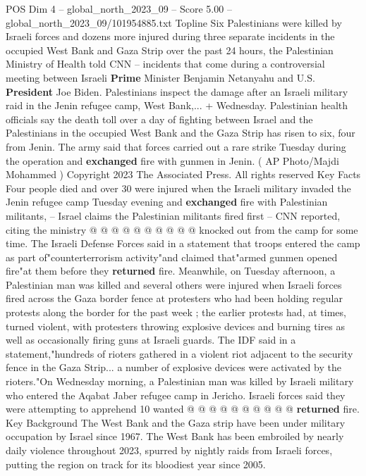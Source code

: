 \begin{textsample}{POS Dim 4 – global\_north\_2023\_09 – Score 5.00 – global\_north\_2023\_09/101954885.txt}  \label{ex:f4_pos_419}
Topline Six Palestinians were killed by Israeli forces and dozens more injured during three separate incidents in the occupied West Bank and Gaza Strip over the past 24 hours, the Palestinian Ministry of Health told CNN -- incidents that come during a controversial meeting between Israeli \textbf{Prime} Minister Benjamin Netanyahu and U.S. \textbf{President} Joe Biden.
Palestinians inspect the damage after an Israeli military raid in the Jenin refugee camp, West Bank,... + Wednesday.
Palestinian health officials say the death toll over a day of fighting between Israel and the Palestinians in the occupied West Bank and the Gaza Strip has risen to six, four from Jenin.
The army said that forces carried out a rare strike Tuesday during the operation and \textbf{exchanged} fire with gunmen in Jenin. ( AP Photo/Majdi Mohammed ) Copyright 2023 The Associated Press.
All rights reserved Key Facts Four people died and over 30 were injured when the Israeli military invaded the Jenin refugee camp Tuesday evening and \textbf{exchanged} fire with Palestinian militants, -- Israel claims the Palestinian militants fired first -- CNN reported, citing the ministry @ @ @ @ @ @ @ @ @ @ knocked out from the camp for some time.
The Israeli Defense Forces said in a statement that troops entered the camp as part of"counterterrorism activity"and claimed that"armed gunmen opened fire"at them before they \textbf{returned} fire.
Meanwhile, on Tuesday afternoon, a Palestinian man was killed and several others were injured when Israeli forces fired across the Gaza border fence at protesters who had been holding regular protests along the border for the past week ; the earlier protests had, at times, turned violent, with protesters throwing explosive devices and burning tires as well as occasionally firing guns at Israeli guards.
The IDF said in a statement,"hundreds of rioters gathered in a violent riot adjacent to the security fence in the Gaza Strip... a number of explosive devices were activated by the rioters."On Wednesday morning, a Palestinian man was killed by Israeli military who entered the Aqabat Jaber refugee camp in Jericho.
Israeli forces said they were attempting to apprehend 10 wanted @ @ @ @ @ @ @ @ @ @ \textbf{returned} fire.
Key Background The West Bank and the Gaza strip have been under military occupation by Israel since 1967.
The West Bank has been embroiled by nearly daily violence throughout 2023, spurred by nightly raids from Israeli forces, putting the region on track for its bloodiest year since 2005.

\end{textsample}
